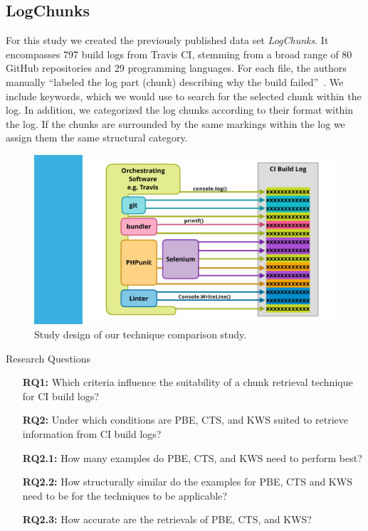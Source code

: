 \subsection{LogChunks}
For this study we created the previously published data set \emph{LogChunks}.
It encompasses 797 build logs from Travis CI, stemming from a broad range of 80
GitHub repositories and 29 programming languages. For each file, the authors
manually ``labeled the log part (chunk) describing why the build failed''~\cite{brandt2020logchunks}.
We include keywords, which we would use to search for the selected chunk
within the log. In addition, we categorized the log chunks according to their
format within the log. If the chunks are surrounded by the same markings within
the log we assign them the same structural category.

\begin{figure}[!t]
	\centering
	\includegraphics[page=2, width=\columnwidth, trim={0cm 1cm 1.5cm 0.5cm}, clip]{img/overview-graphics.pdf}
	\caption{Study design of our technique comparison study.}
	\label{fig:study}
\end{figure}


\begin{simplebox}{Research Questions}
\begin{itemize}
  \item[\textbf{RQ1:}] Which criteria influence the suitability of a chunk retrieval technique for CI build logs?
  \item[\textbf{RQ2:}] Under which conditions are PBE, CTS, and KWS suited to retrieve information from CI build logs?
  \item[\textbf{RQ2.1:}] How many examples do PBE, CTS, and KWS need to perform best?
  \item[\textbf{RQ2.2:}] How structurally similar do the examples for PBE, CTS and KWS need to be for the techniques to be applicable?
  \item[\textbf{RQ2.3:}] How accurate are the retrievals of PBE, CTS, and KWS?
\end{itemize}
\end{simplebox}

